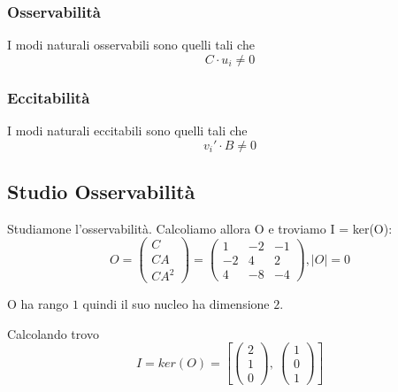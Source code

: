 \documentclass{article}
\begin{document}
\subsubsection{Osservabilità}
 I modi naturali osservabili sono quelli tali che 
\[ C \cdot u_i   \neq 0\]
\subsubsection{Eccitabilità}
 I modi naturali eccitabili sono quelli tali che 
\[v_i' \cdot B \neq 0\]

\subsection{Studio Osservabilità}

Studiamone l’osservabilità. Calcoliamo allora O e troviamo I = ker(O):
\[
 O = \begin{pmatrix}C \\ CA \\ CA^2 \end{pmatrix} = \left(\begin{matrix}1 & -2 & -1\\-2 & 4 & 2\\4 & -8 & -4\end{matrix}\right), |O| = 0 \]

O ha rango $ 1 $ quindi il suo nucleo ha dimensione $ 2 $.

Calcolando trovo \[ 
I = ker(O) = \left[ \left(\begin{matrix}2\\1\\0\end{matrix}\right), \  \left(\begin{matrix}1\\0\\1\end{matrix}\right)\right]\]
\end{document}
